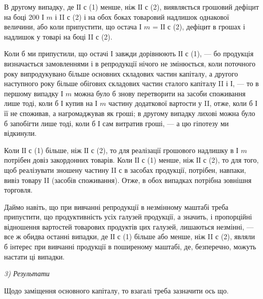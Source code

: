 В другому випадку, де ІІ $с$ (1) менше, ніж ІІ $с$ (2), виявляється грошовий
дефіцит на боці 200 І $m$ і II $с$ (2) і на обох боках товаровий надлишок
однакової величини, або коли припустити, що остача І $m$ = ІІ $с$ (2), дефіцит
в грошах і надлишок у товарі на боці II $с$ (2).

Коли б ми припустили, що остачі І завжди дорівнюють ІІ $с$ (1), — бо
продукція визначається замовленнями і в репродукції нічого не змінюється,
коли поточного року випродукувано більше основних складових частин
капіталу, а другого наступного року більше обігових складових частин
сталого капіталу II і І, — то в першому випадку І $m$ можна було б знову
перетворити на засоби споживання лише тоді, коли б І купив на І $m$
частину додаткової вартости у II, отже, коли б І її не споживав, а нагромаджував
як гроші; в другому випадку лихові можна було б запобігти
лише тоді, коли б І сам витратив гроші, — а цю гіпотезу ми
відкинули.

Коли ІІ $с$ (1) більше, ніж ІІ $с$ (2), то для реалізації грошового надлишку
в І $m$ потрібен довіз закордонних товарів. Коли ІІ $с$ (1) менше, ніж ІІ $с$
(2), то для того, щоб реалізувати зношену частину II $с$ в засобах продукції,
потрібен, навпаки, вивіз товару II (засобів споживання). Отже, в
обох випадках потрібна зовнішня торговля.

Даймо навіть, що при вивчанні репродукції в незмінному маштабі
треба припустити, що продуктивність усіх галузей продукції, а значить,
і пропорційні відношення вартостей товарових продуктів цих галузей,
лишаються незмінні, — все ж обидва останні випадки, де ІІ $с$ (1) більше
або менше, ніж II $с$ (2), являли б інтерес при вивчанні продукції в поширеному
маштабі, де, безперечно, можуть настати ці випадки.

\begin{center}
  \emph{3) Результати}
\end{center}

Щодо заміщення основного капіталу, то взагалі треба зазначити ось що.

